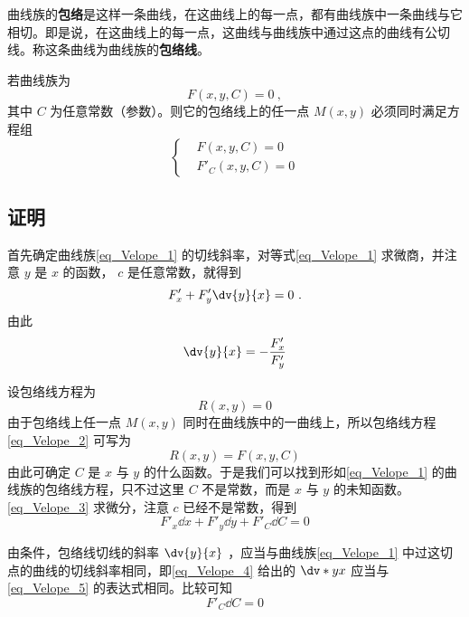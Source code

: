 曲线族的\textbf{包络}是这样一条曲线，在这曲线上的每一点，都有曲线族中一条曲线与它相切。即是说，在这曲线上的每一点，这曲线与曲线族中通过这点的曲线有公切线。称这条曲线为曲线族的\textbf{包络线}。

若曲线族为 
\begin{equation}\label{eq_Velope_1}
F(x,y,C)=0~,
\end{equation}
其中 $C$ 为任意常数（参数）。则它的包络线上的任一点 $M(x,y)$ 必须同时满足方程组
\begin{equation}\label{eq_Velope_6}
\left\{\begin{aligned}
&F(x,y,C)=0\\
&F'_C(x,y,C)=0
\end{aligned}\right.
\end{equation}
\subsection{证明}
首先确定曲线族\autoref{eq_Velope_1} 的切线斜率，对等式\autoref{eq_Velope_1} 求微商，并注意 $y$ 是 $x$ 的函数， $c$ 是任意常数，就得到
\begin{equation}
F'_x+F'_y\dv{y}{x}=0~.
\end{equation}
由此
\begin{equation}\label{eq_Velope_5}
\dv{y}{x}=-\frac{F'_x}{F'_y}
\end{equation}

设包络线方程为
\begin{equation}\label{eq_Velope_2}
R(x,y)=0
\end{equation}
由于包络线上任一点 $M(x,y)$ 同时在曲线族中的一曲线上，所以包络线方程\autoref{eq_Velope_2} 可写为
\begin{equation}\label{eq_Velope_3}
R(x,y)=F(x,y,C)
\end{equation}
由此可确定 $C$ 是 $x$ 与 $y$ 的什么函数。于是我们可以找到形如\autoref{eq_Velope_1} 的曲线族的包络线方程，只不过这里 $C$ 不是常数，而是 $x$ 与 $y$ 的未知函数。\autoref{eq_Velope_3} 求微分，注意 $c$ 已经不是常数，得到
\begin{equation}\label{eq_Velope_4}
F'_x\dd x+F'_y\dd y+F'_C\dd C=0
\end{equation}

由条件，包络线切线的斜率 $\dv{y}{x}$ ，应当与曲线族\autoref{eq_Velope_1} 中过这切点的曲线的切线斜率相同，即\autoref{eq_Velope_4} 给出的 $\dv*{y}{x}$ 应当与\autoref{eq_Velope_5} 的表达式相同。比较可知
\begin{equation}
F'_C\dd C=0
\end{equation}

